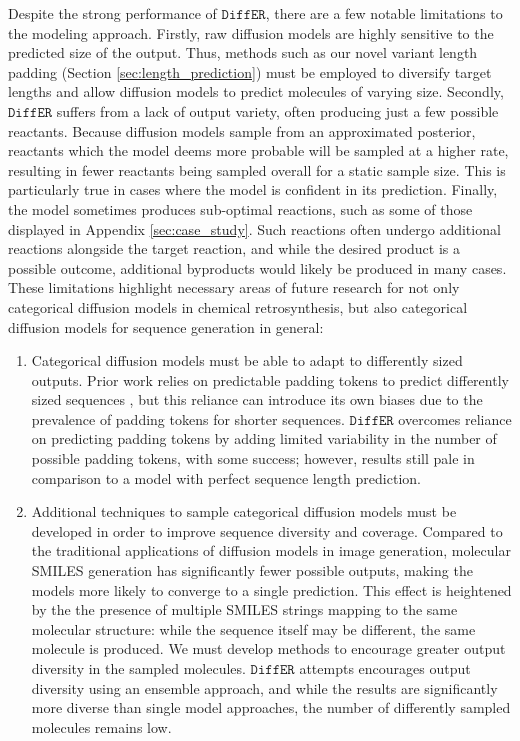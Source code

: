 \documentclass{article}
\newcommand{\ours}{$\texttt{DiffER}$\xspace}
\begin{document}
Despite the strong performance of \ours, there are a few notable limitations to the modeling approach. Firstly, raw diffusion models are highly sensitive to the predicted size of the output. Thus, methods such as our novel variant length padding (Section \ref{sec:length_prediction}) must be employed to diversify target lengths and allow diffusion models to predict molecules of varying size. Secondly, \ours suffers from a lack of output variety, often producing just a few possible reactants. Because diffusion models sample from an approximated posterior, reactants which the model deems more probable will be sampled at a higher rate, resulting in fewer reactants being sampled overall for a static sample size. This is particularly true in cases where the model is confident in its prediction. Finally, the model sometimes produces sub-optimal reactions, such as some of those displayed in Appendix \ref{sec:case_study}. Such reactions often undergo additional reactions alongside the target reaction, and while the desired product is a possible outcome, additional byproducts would likely be produced in many cases. These limitations highlight necessary areas of future research for not only categorical diffusion models in chemical retrosynthesis, but also categorical diffusion models for sequence generation in general:
\begin{enumerate}
    \item Categorical diffusion models must be able to adapt to differently sized outputs. Prior work relies on predictable padding tokens to predict differently sized sequences \cite{gong2022diffuseq, gong2023diffuseq}, but this reliance can introduce its own biases due to the prevalence of padding tokens for shorter sequences. \ours overcomes reliance on predicting padding tokens by adding limited variability in the number of possible padding tokens, with some success; however, results still pale in comparison to a model with perfect sequence length prediction.
    \item Additional techniques to sample categorical diffusion models must be developed in order to improve sequence diversity and coverage. Compared to the traditional applications of diffusion models in image generation, molecular SMILES generation has significantly fewer possible outputs, making the models more likely to converge to a single prediction. This effect is heightened by the the presence of multiple SMILES strings mapping to the same molecular structure: while the sequence itself may be different, the same molecule is produced. We must develop methods to encourage greater output diversity in the sampled molecules. \ours attempts encourages output diversity using an ensemble approach, and while the results are significantly more diverse than single model approaches, the number of differently sampled molecules remains low.
\end{enumerate}
\end{document}
